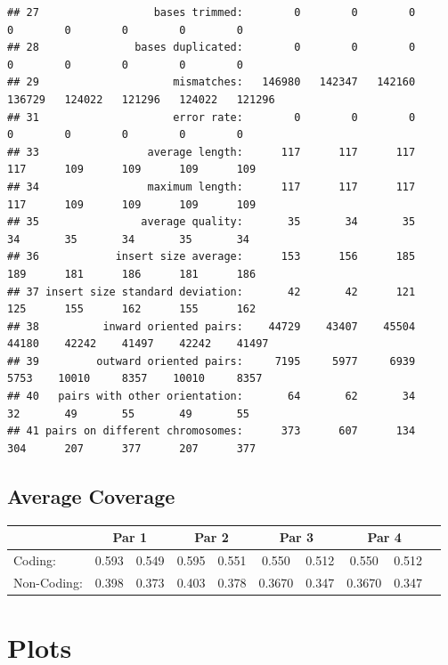 \documentclass[12pt, a4paper]{article}\usepackage[]{graphicx}\usepackage[]{color}
\makeatletter
\newenvironment{kframe}{%
 \def\at@end@of@kframe{}%
 \ifinner\ifhmode%
  \def\at@end@of@kframe{\end{minipage}}%
  \begin{minipage}{\columnwidth}%
 \fi\fi%
 \def\FrameCommand##1{\hskip\@totalleftmargin \hskip-\fboxsep
 \colorbox{shadecolor}{##1}\hskip-\fboxsep
     \hskip-\linewidth \hskip-\@totalleftmargin \hskip\columnwidth}%
 \MakeFramed {\advance\hsize-\width
   \@totalleftmargin\z@ \linewidth\hsize
   \@setminipage}}%
 {\par\unskip\endMakeFramed%
 \at@end@of@kframe}
\newenvironment{knitrout}{}{} %
\makeatother
\begin{document}
\begin{knitrout}
\begin{kframe}
\begin{verbatim}
## 27                  bases trimmed:        0        0        0        0        0        0        0        0
## 28               bases duplicated:        0        0        0        0        0        0        0        0
## 29                     mismatches:   146980   142347   142160   136729   124022   121296   124022   121296
## 31                     error rate:        0        0        0        0        0        0        0        0
## 33                 average length:      117      117      117      117      109      109      109      109
## 34                 maximum length:      117      117      117      117      109      109      109      109
## 35                average quality:       35       34       35       34       35       34       35       34
## 36            insert size average:      153      156      185      189      181      186      181      186
## 37 insert size standard deviation:       42       42      121      125      155      162      155      162
## 38          inward oriented pairs:    44729    43407    45504    44180    42242    41497    42242    41497
## 39         outward oriented pairs:     7195     5977     6939     5753    10010     8357    10010     8357
## 40   pairs with other orientation:       64       62       34       32       49       55       49       55
## 41 pairs on different chromosomes:      373      607      134      304      207      377      207      377
\end{verbatim}
\end{kframe}
\end{knitrout}

\subsection{Average Coverage}

\begin{tabular}{l|c|c|c|c|c|c|c|c|c}
\cline{2-9}
&\multicolumn{2}{|c|}{Par 1}&\multicolumn{2}{|c|}{Par 2}&\multicolumn{2}{|c|}{Par 3}&\multicolumn{2}{|c|}{Par 4}\\
\hline
\multicolumn{1}{|l|}{Coding:}&0.593&0.549 &0.595&0.551 &0.550&0.512 &0.550&0.512\\
\hline
\multicolumn{1}{|l|}{Non-Coding:}&0.398&0.373 &0.403&0.378 &0.3670&0.347 &0.3670&0.347\\
\hline
\end{tabular}


\section{Plots}
\end{document}
